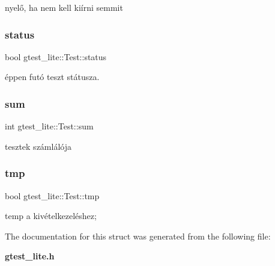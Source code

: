 nyelő, ha nem kell kiírni semmit 

\mbox{\label{structgtest__lite_1_1_test_a59a9a7f0ef7867af604ce5678f7a2c13}} 
\subsubsection{status}
{\footnotesize\ttfamily bool gtest\+\_\+lite\+::\+Test\+::status}



éppen futó teszt státusza. 

\mbox{\label{structgtest__lite_1_1_test_a6da678d43b72b9e2bff1c99e1d3c48f5}} 
\subsubsection{sum}
{\footnotesize\ttfamily int gtest\+\_\+lite\+::\+Test\+::sum}



tesztek számlálója 

\mbox{\label{structgtest__lite_1_1_test_a1145ceb335a60a808b7b4d5d1624b2a5}} 
\subsubsection{tmp}
{\footnotesize\ttfamily bool gtest\+\_\+lite\+::\+Test\+::tmp}



temp a kivételkezeléshez; 



The documentation for this struct was generated from the following file\+:\begin{DoxyCompactItemize}
\item 
\textbf{ gtest\+\_\+lite.\+h}\end{DoxyCompactItemize}
